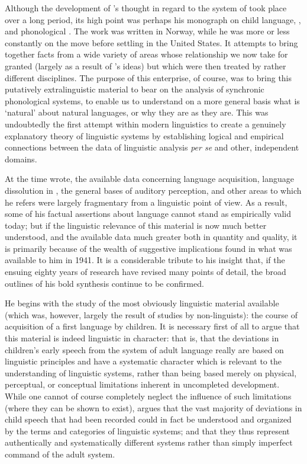 Although the development of {\Jakobson}'s thought in regard to the system
of  took place over a long period, its high point
was perhaps his \citeyear{jakobson:kindersprache} monograph on child
language, , and phonological . The work was written
in Norway, while he was more or less constantly on the move before
settling in the United States. It attempts to bring together facts
from a wide variety of areas whose relationship we now take for
granted (largely as a result of {\Jakobson}'s ideas) but which were then
treated by rather different disciplines. The purpose of this
enterprise, of course, was to bring this putatively extralinguistic
material to bear on the analysis of synchronic phonological systems,
to enable us to understand on a more general basis what is `natural'
about natural languages, or why they are as they are. This was
undoubtedly the first attempt within modern linguistics to create a
genuinely explanatory theory of linguistic systems by establishing
logical and empirical connections between the data of linguistic
analysis \emph{per se} and other, independent domains.

At the time {\Jakobson} wrote, the available data concerning language
acquisition, language dissolution in , the general bases of
auditory perception, and other areas to which he refers were largely
fragmentary from a linguistic point of view. As a result, some of his
factual assertions about language cannot stand as empirically valid
today; but if the linguistic relevance of this material is now much
better understood, and the available data much greater both in
quantity and quality, it is primarily because of the wealth of
suggestive implications {\Jakobson} found in what was available to him in
1941. It is a considerable tribute to his insight that, if the ensuing
eighty years of research have revised many points of detail, the broad
outlines of his bold synthesis continue to be confirmed.

He begins with the study of the most obviously linguistic material
available (which was, however, largely the result of studies by
non-linguists): the course of acquisition of a first language by
children. It is necessary first of all to argue that this material is
indeed linguistic in character: that is, that the deviations in
children's early speech from the system of adult language really are
based on linguistic principles and have a systematic character which
is relevant to the understanding of linguistic systems, rather than
being based merely on physical, perceptual, or conceptual limitations
inherent in uncompleted development. While one cannot of course
completely neglect the influence of such limitations (where they can
be shown to exist), {\Jakobson} argues that the vast majority of
deviations in child speech that had been recorded could in fact be
understood and organized by the terms and categories of linguistic
systems; and that they thus represent authentically and systematically
different systems rather than simply imperfect command of the adult
system.

